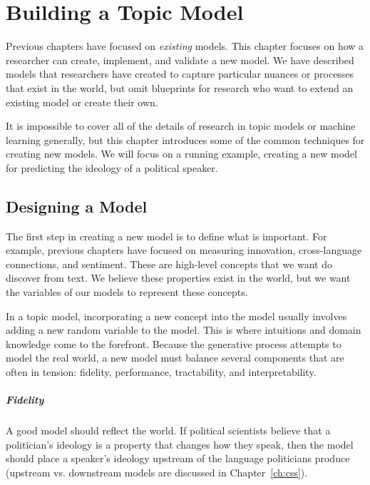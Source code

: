 \chapter{Building a Topic Model}
\label{ch:building}

Previous chapters have focused on \emph{existing} models.  This
chapter focuses on how a researcher can create, implement, and
validate a new model.  We have described
models that researchers have created to capture particular nuances or
processes that exist in the world, but omit blueprints
for research who want to extend an existing model or create their own.

It is impossible to cover all of the details of research in topic
models or machine learning generally, but this chapter introduces some
of the common techniques for creating new models.  We will focus on a
running example, creating a new model for predicting the
ideology of a political speaker.

\section{Designing a Model}

The first step in creating a new model is to define what is
important.  For example, previous chapters have focused on measuring
innovation, cross-language connections, and sentiment.  These are
high-level concepts that we want do discover from text.  We believe
these properties exist in the world, but we want the variables of our models to represent
these concepts.

In a topic model, incorporating a new concept into the model usually
involves adding a new random variable to the model.  This is where
intuitions and domain knowledge come to the forefront.  Because the
generative process attempts to model the real world, a new model must
balance several components that are often in tension: fidelity,
performance, tractability, and interpretability.

\paragraph{Fidelity}

A good model should reflect the world.  If political scientists
believe that a politician's ideology is a property that changes how they speak, then the model should place a
speaker's ideology upstream of the language politicians produce
(upstream vs. downstream models are discussed in Chapter~\ref{ch:css}).

